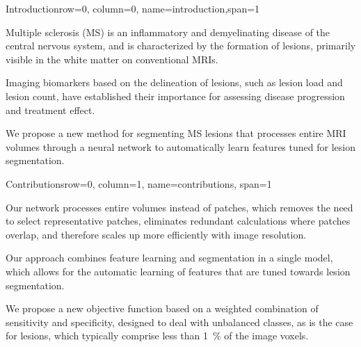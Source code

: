 \documentclass[%
portrait,paperwidth=841mm,paperheight=1180mm,%
margin=2cm,
fontscale=0.32
]{baposter}
\begin{document}
\begin{poster}

% 
% 


\begin{headerblock}{Introduction}{row=0, column=0, name=introduction,span=1}
\begin{compactitem}
\item Multiple sclerosis (MS) is an inflammatory and demyelinating disease of
the central nervous system, and is characterized by the formation of lesions,
primarily visible in the white matter on conventional MRIs.
\item Imaging biomarkers based on the delineation of lesions, such as lesion
load and lesion count, have established their importance for assessing disease
progression and treatment effect.
\item We propose a new method for segmenting MS lesions that processes entire
MRI volumes through a neural network
to automatically learn features tuned for lesion segmentation. 
\end{compactitem}
\end{headerblock}


\begin{headerblock}{Contributions}{row=0, column=1, name=contributions,
span=1}
\begin{compactitem}
\item Our network processes entire volumes instead of patches, which removes the
need to select representative patches, eliminates redundant calculations where
patches overlap, and therefore scales up more efficiently with image resolution.
\item Our approach combines feature learning and segmentation in a single model,
which allows for the automatic learning of features that are tuned towards lesion
segmentation.
\item We propose a new objective function based on a weighted combination of
sensitivity and specificity, designed to deal with unbalanced classes, as is the
case for lesions, which typically comprise less than \SI{1}{\percent} of the
image voxels.
\end{compactitem}
\end{headerblock}


\end{poster}
\end{document}
